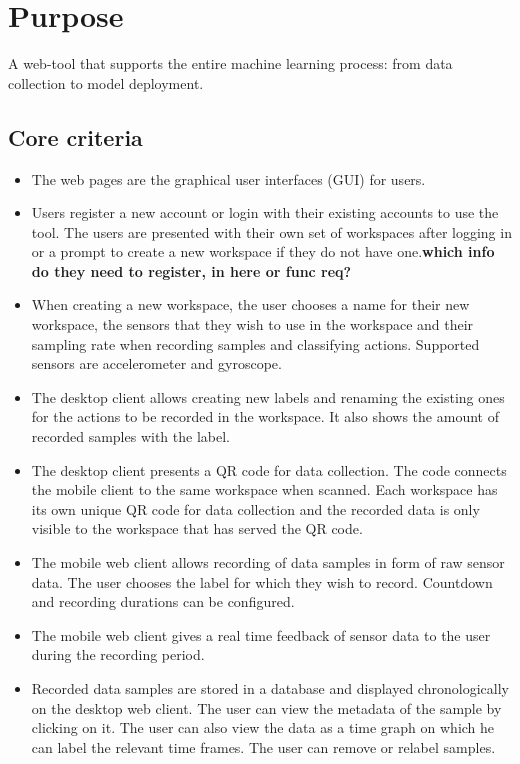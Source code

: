 \section{Purpose}
A web-tool that supports the entire machine learning process: from data collection to model deployment.

\subsection{Core criteria}
\begin{itemize}
    \item The web pages are the graphical user interfaces (GUI) for users.
    \item Users register a new account or login with their existing accounts to use the tool. The users are presented with their own set of workspaces after logging in or a prompt to create a new workspace if they do not have one.\textbf{which info do they need to register, in here or func req?}
    \item When creating a new workspace, the user chooses a name for their new workspace, the sensors that they wish to use in the workspace and their sampling rate when recording samples and classifying actions. Supported sensors are accelerometer and gyroscope.
    \item The desktop client allows creating new labels and renaming the existing ones for the actions to be recorded in the workspace. It also shows the amount of recorded samples with the label. 
    \item The desktop client presents a QR code for data collection. The code connects the mobile client to the same \gls{workspace} when scanned. Each workspace has its own unique QR code for data collection and the recorded data is only visible to the workspace that has served the QR code.
    \item The mobile web client allows recording of data samples in form of raw sensor data. The user chooses the label for which they wish to record. Countdown and recording durations can be configured.
    \item The mobile web client gives a real time feedback of sensor data to the user during the recording period.
    \item Recorded data samples are stored in a database and displayed chronologically on the desktop web client. The user can view the metadata of the sample by clicking on it. The user can also view the data as a time graph on which he can label the relevant time frames. The user can remove or relabel samples.

\end{itemize}
